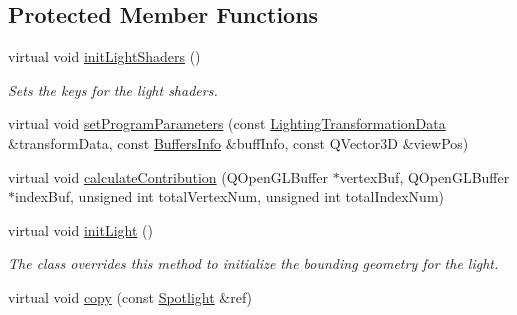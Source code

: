 \subsection*{Protected Member Functions}
\begin{DoxyCompactItemize}
\item 
\mbox{\label{class_geometry_engine_1_1_geometry_world_item_1_1_geometry_light_1_1_spotlight_a3e9b0e3c458ea56708a16f8f988b01ce}} 
virtual void \mbox{\hyperlink{class_geometry_engine_1_1_geometry_world_item_1_1_geometry_light_1_1_spotlight_a3e9b0e3c458ea56708a16f8f988b01ce}{init\+Light\+Shaders}} ()
\begin{DoxyCompactList}\small\item\em Sets the keys for the light shaders. \end{DoxyCompactList}\item 
virtual void \mbox{\hyperlink{class_geometry_engine_1_1_geometry_world_item_1_1_geometry_light_1_1_spotlight_aa84b616ae13b58f991e6b86311cd8e9a}{set\+Program\+Parameters}} (const \mbox{\hyperlink{class_geometry_engine_1_1_lighting_transformation_data}{Lighting\+Transformation\+Data}} \&transform\+Data, const \mbox{\hyperlink{class_geometry_engine_1_1_buffers_info}{Buffers\+Info}} \&buff\+Info, const Q\+Vector3D \&view\+Pos)
\item 
virtual void \mbox{\hyperlink{class_geometry_engine_1_1_geometry_world_item_1_1_geometry_light_1_1_spotlight_a6136ca2338a7b5f5be70ccab82fe655e}{calculate\+Contribution}} (Q\+Open\+G\+L\+Buffer $\ast$vertex\+Buf, Q\+Open\+G\+L\+Buffer $\ast$index\+Buf, unsigned int total\+Vertex\+Num, unsigned int total\+Index\+Num)
\item 
\mbox{\label{class_geometry_engine_1_1_geometry_world_item_1_1_geometry_light_1_1_spotlight_a47bba760d5da4f574274be437d5ddd04}} 
virtual void \mbox{\hyperlink{class_geometry_engine_1_1_geometry_world_item_1_1_geometry_light_1_1_spotlight_a47bba760d5da4f574274be437d5ddd04}{init\+Light}} ()
\begin{DoxyCompactList}\small\item\em The class overrides this method to initialize the bounding geometry for the light. \end{DoxyCompactList}\item 
virtual void \mbox{\hyperlink{class_geometry_engine_1_1_geometry_world_item_1_1_geometry_light_1_1_spotlight_a72de80e80891832884e039beec532e19}{copy}} (const \mbox{\hyperlink{class_geometry_engine_1_1_geometry_world_item_1_1_geometry_light_1_1_spotlight}{Spotlight}} \&ref)
\end{DoxyCompactItemize}
